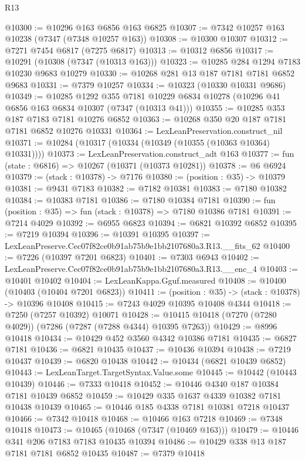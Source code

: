 \begin{lexlean}{R13}
\begin{coremodule}
@10300 := @10296 @163 @6856 @163 @6825
@10307 := @7342 @10257 @163 @10238 (@7347 (@7348 @10257 @163))
@10308 := @10300 @10307
@10312 := @7271 @7454 @6817 (@7275 @6817)
@10313 := @10312 @6856
@10317 := @10291 (@10308 (@7347 (@10313 @163)))
@10323 := @10285 @284 @1294 @7183 @10230 @9683 @10279
@10330 := @10268 @281 @13 @187 @7181 @7181 @6852 @9683
@10331 := @7379 @10257
@10334 := @10323 (@10330 @10331 @9686)
@10349 := @10285
    @1292
    @355
    @7181
    @10229
    @6834
    @10278
    (@10296 @41 @6856 @163 @6834 @10307 (@7347 (@10313 @41)))
@10355 := @10285 @353 @187 @7183 @7181 @10276 @6852
@10363 := @10268 @350 @20 @187 @7181 @7181 @6852 @10276 @10331
@10364 := LexLeanPreservation.construct_nil
@10371 := @10284 (@10317 (@10334 (@10349 (@10355 (@10363 @10364) @10331))))
@10373 := LexLeanPreservation.construct_adt @163
@10377 := fun (state : @6816) => @10267 (@10371 (@10373 @10281))
@10378 := @6 @6924
@10379 := (stack : @10378) -> @7176
@10380 := (position : @35) -> @10379
@10381 := @9431 @7183
@10382 := @7182 @10381
@10383 := @7180 @10382
@10384 := @10383 @7181
@10386 := @7180 @10384 @7181
@10390 := fun (position : @35) => fun (stack : @10378) => @7180 @10386 @7181
@10391 := @7214 @4029
@10392 := @6955 @6823
@10394 := @6821 @10392 @6852
@10395 := @7219 @10394
@10396 := @10391 @10395
@10397 := LexLeanPreserve.Cec07f82ce0b91ab75b9e1bb2107680a3.R13.__fits_62
@10400 := @7226 (@10397 @7201 @6823)
@10401 := @7303 @6943
@10402 := LexLeanPreserve.Cec07f82ce0b91ab75b9e1bb2107680a3.R13.__enc_4
@10403 := @10401 @10402
@10404 := LexLeanKappa.Gguf.measured
@10408 := @10400 (@10403 (@10404 @7201 @6823))
@10411 := (position : @35) -> (stack : @10378) -> @10396 @10408
@10415 := @7243 @4029 @10395 @10408 @4344
@10418 := @7250 (@7257 @10392) @10071
@10428 := @10415 @10418 (@7270 (@7280 @4029)) (@7286 (@7287 (@7288 @4344) @10395 @7263))
@10429 := @8996 @10418
@10434 := @10429 @452 @3560 @4342 @10386 @7181
@10435 := @6827 @7181
@10436 := @6821 @10435
@10437 := @10436 @10394
@10438 := @7219 @10437
@10439 := @6820 @10438
@10442 := @10434 (@6821 @10439 @6852)
@10443 := LexLeanTarget.TargetSyntax.Value.some
@10445 := @10442 (@10443 @10439)
@10446 := @7333 @10418
@10452 := @10446 @4340 @187 @10384 @7181 @10439 @6852
@10459 := @10429 @335 @1637 @4339 @10382 @7181 @10438 @10439
@10465 := @10446 @185 @4338 @7181 @10381 @7218 @10437
@10466 := @7342 @10418
@10468 := @10466 @163 @7218
@10469 := @7348 @10418
@10473 := @10465 (@10468 (@7347 (@10469 @163)))
@10479 := @10446 @341 @206 @7183 @7183 @10435 @10394
@10486 := @10429 @338 @13 @187 @7181 @7181 @6852 @10435
@10487 := @7379 @10418

\end{coremodule}
\end{lexlean}
